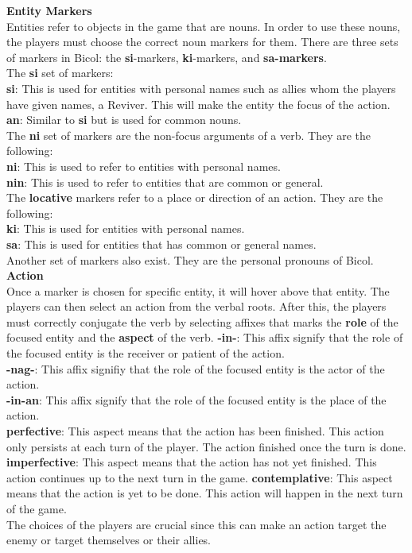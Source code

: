 \documentclass[11pt]{article}
\begin{document}
\textbf{Entity Markers}\\
Entities refer to objects in the game that are nouns. In order to use these nouns, the players must choose the correct noun markers for them. There are three sets of markers in Bicol: the \textbf{si}-markers, \textbf{ki}-markers, and \textbf{sa-markers}.\\
The \textbf{si} set of markers:\\
\textbf{si}: This is used for entities with personal names such as allies whom the players have given names, a Reviver. This will make the entity the focus of the action.
\textbf{an}: Similar to \textbf{si} but is used for common nouns.\\
The \textbf{ni} set of markers are the non-focus arguments of a verb. They are the following:\\
\textbf{ni}: This is used to refer to entities with personal names.\\
\textbf{nin}: This is used to refer to entities that are common or general.\\
The \textbf{locative} markers refer to a place or direction of an action. They are the following:\\
\textbf{ki}: This is used for entities with personal names.\\
\textbf{sa}: This is used for entities that has common or general names.\\
Another set of markers also exist. They are the personal pronouns of Bicol.\\

\textbf{Action}\\
Once a marker is chosen for specific entity, it will hover above that entity. The players can then select an action from the verbal roots. After this, the players must correctly conjugate the verb by selecting affixes that marks the \textbf{role} of the focused entity and the \textbf{aspect} of the verb.
\textbf{-in-}: This affix signify that the role of the focused entity is the receiver or patient of the action.\\
\textbf{-nag-}: This affix signifiy that the role of the focused entity is the actor of the action.\\
\textbf{-in-an}: This affix signify that the role of the focused entity is the place of the action.\\
\textbf{perfective}: This aspect means that the action has been finished. This action only persists at each turn of the player. The action finished once the turn is done.
\textbf{imperfective}: This aspect means that the action has not yet finished. This action continues up to the next turn in the game.
\textbf{contemplative}: This aspect means that the action is yet to be done. This action will happen in the next turn of the game.\\
The choices of the players are crucial since this can make an action target the enemy or target themselves or their allies.\\
\end{document}
